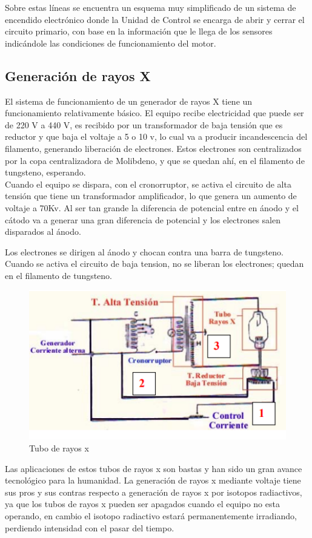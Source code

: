 Sobre estas líneas se encuentra un esquema muy simplificado de
un sistema de encendido electrónico donde la Unidad de Control se
encarga de abrir y cerrar el circuito primario, con base en la información
que le llega de los sensores indicándole las condiciones de
funcionamiento del motor. \cite{ignicion}

\subsection{Generación de rayos X}

El sistema de funcionamiento de un generador de rayos X tiene un funcionamiento relativamente básico.  El equipo recibe electricidad que puede ser de 220 V a 440 V, es recibido por un transformador de baja tensión que es reductor y que baja el voltaje a 5 o 10 v, lo cual va a producir incandescencia del filamento, generando liberación de electrones. Estos electrones son centralizados por la copa centralizadora de Molibdeno, y que se quedan ahí, en el filamento de tungsteno, esperando. \\

Cuando el equipo se dispara, con el cronorruptor, se activa el circuito de alta tensión que tiene un transformador amplificador, lo que genera un aumento de voltaje a 70Kv. Al ser tan grande la diferencia de potencial entre en ánodo y el cátodo va a generar una gran diferencia de potencial y los electrones salen disparados al ánodo. 

Los electrones se dirigen al ánodo y chocan contra una barra de tungsteno. Cuando se activa el circuito de baja tension, no se liberan los electrones; quedan en el filamento de tungsteno.\\

\begin{figure}[H]
\centering
\includegraphics[width=12cm]{capitulo3/figs/rayos.png}
\caption{ Tubo de rayos x}
\end{figure}

Las aplicaciones de estos tubos de rayos x son bastas y han sido un gran avance tecnológico para la humanidad. La generación de rayos x mediante voltaje tiene sus pros y sus contras respecto a generación de rayos x por isotopos radiactivos, ya que los tubos de rayos x pueden ser apagados cuando el equipo no esta operando, en cambio el isotopo radiactivo estará permanentemente irradiando, perdiendo intensidad con el pasar del tiempo.  \\


